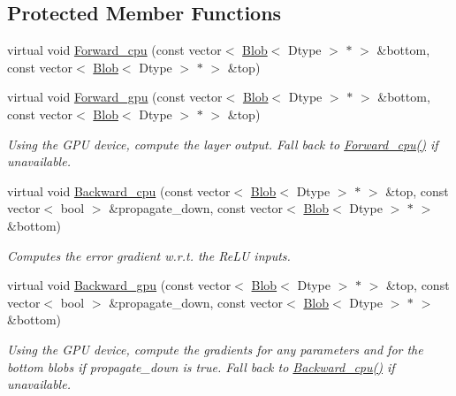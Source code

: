 \subsection*{Protected Member Functions}
\begin{DoxyCompactItemize}
\item 
virtual void \hyperlink{classcaffe_1_1ReLULayer_aab91a81886843afbe167881b16432947}{Forward\+\_\+cpu} (const vector$<$ \hyperlink{classcaffe_1_1Blob}{Blob}$<$ Dtype $>$ $\ast$ $>$ \&bottom, const vector$<$ \hyperlink{classcaffe_1_1Blob}{Blob}$<$ Dtype $>$ $\ast$ $>$ \&top)
\item 
virtual void \hyperlink{classcaffe_1_1ReLULayer_addcdd688e5f137181dc9f28c01252d75}{Forward\+\_\+gpu} (const vector$<$ \hyperlink{classcaffe_1_1Blob}{Blob}$<$ Dtype $>$ $\ast$ $>$ \&bottom, const vector$<$ \hyperlink{classcaffe_1_1Blob}{Blob}$<$ Dtype $>$ $\ast$ $>$ \&top)\hypertarget{classcaffe_1_1ReLULayer_addcdd688e5f137181dc9f28c01252d75}{}\label{classcaffe_1_1ReLULayer_addcdd688e5f137181dc9f28c01252d75}

\begin{DoxyCompactList}\small\item\em Using the G\+PU device, compute the layer output. Fall back to \hyperlink{classcaffe_1_1ReLULayer_aab91a81886843afbe167881b16432947}{Forward\+\_\+cpu()} if unavailable. \end{DoxyCompactList}\item 
virtual void \hyperlink{classcaffe_1_1ReLULayer_a2a8eacfffacb2d71583d6f837c19db8b}{Backward\+\_\+cpu} (const vector$<$ \hyperlink{classcaffe_1_1Blob}{Blob}$<$ Dtype $>$ $\ast$ $>$ \&top, const vector$<$ bool $>$ \&propagate\+\_\+down, const vector$<$ \hyperlink{classcaffe_1_1Blob}{Blob}$<$ Dtype $>$ $\ast$ $>$ \&bottom)
\begin{DoxyCompactList}\small\item\em Computes the error gradient w.\+r.\+t. the Re\+LU inputs. \end{DoxyCompactList}\item 
virtual void \hyperlink{classcaffe_1_1ReLULayer_ade10fe5dc516efca618ecfd0d9562679}{Backward\+\_\+gpu} (const vector$<$ \hyperlink{classcaffe_1_1Blob}{Blob}$<$ Dtype $>$ $\ast$ $>$ \&top, const vector$<$ bool $>$ \&propagate\+\_\+down, const vector$<$ \hyperlink{classcaffe_1_1Blob}{Blob}$<$ Dtype $>$ $\ast$ $>$ \&bottom)\hypertarget{classcaffe_1_1ReLULayer_ade10fe5dc516efca618ecfd0d9562679}{}\label{classcaffe_1_1ReLULayer_ade10fe5dc516efca618ecfd0d9562679}

\begin{DoxyCompactList}\small\item\em Using the G\+PU device, compute the gradients for any parameters and for the bottom blobs if propagate\+\_\+down is true. Fall back to \hyperlink{classcaffe_1_1ReLULayer_a2a8eacfffacb2d71583d6f837c19db8b}{Backward\+\_\+cpu()} if unavailable. \end{DoxyCompactList}\end{DoxyCompactItemize}
